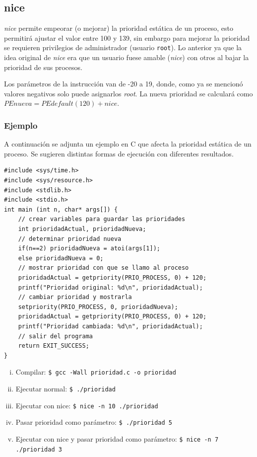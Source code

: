 \subsection{nice}
\textit{nice} permite empeorar (o mejorar) la prioridad estática de un proceso,
esto permitirá ajustar el valor entre 100 y 139, sin embargo para mejorar la
prioridad se requieren privilegios de administrador (usuario \texttt{root}). Lo
anterior ya que la idea original de \textit{nice} era que un usuario fuese
amable (\textit{nice}) con otros al bajar la prioridad de sus procesos.

Los parámetros de la instrucción van de -20 a 19, donde, como ya se mencionó
valores negativos solo puede asignarlos \textit{root}. La nueva prioridad se
calculará como $PE nueva = PE default (120) + nice$.

\subsubsection{Ejemplo}
A continuación se adjunta un ejemplo en C que afecta la prioridad estática de
un proceso. Se sugieren distintas formas de ejecución con diferentes resultados.

\begin{lstlisting}
#include <sys/time.h>
#include <sys/resource.h>
#include <stdlib.h>
#include <stdio.h>
int main (int n, char* args[]) {
    // crear variables para guardar las prioridades
    int prioridadActual, prioridadNueva;
    // determinar prioridad nueva
    if(n==2) prioridadNueva = atoi(args[1]);
    else prioridadNueva = 0;
    // mostrar prioridad con que se llamo al proceso
    prioridadActual = getpriority(PRIO_PROCESS, 0) + 120;
    printf("Prioridad original: %d\n", prioridadActual);
    // cambiar prioridad y mostrarla
    setpriority(PRIO_PROCESS, 0, prioridadNueva);
    prioridadActual = getpriority(PRIO_PROCESS, 0) + 120;
    printf("Prioridad cambiada: %d\n", prioridadActual);
    // salir del programa
    return EXIT_SUCCESS;
}
\end{lstlisting}

\begin{enumerate}[i.]
\item Compilar: \texttt{\$ gcc -Wall prioridad.c -o prioridad}
\item Ejecutar normal: \texttt{\$ ./prioridad}
\item Ejecutar con nice: \texttt{\$ nice -n 10 ./prioridad}
\item Pasar prioridad como parámetro: \texttt{\$ ./prioridad 5}
\item Ejecutar con nice y pasar prioridad como parámetro: \texttt{\$ nice -n 7
./prioridad 3}
\end{enumerate}

